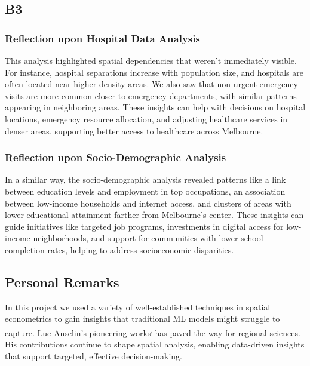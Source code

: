 \documentclass[
	a4paper, %
	10pt, %
	unnumberedsections, %
	twoside, %
]{LTJournalArticle}
\begin{document}
\subsection{B3}

\subsubsection{Reflection upon Hospital Data Analysis} \leavevmode
 
This analysis highlighted spatial dependencies that weren’t immediately visible. For instance, hospital separations increase with population size, and hospitals are often located near higher-density areas. We also saw that non-urgent emergency visits are more common closer to emergency departments, with similar patterns appearing in neighboring areas. These insights can help with decisions on hospital locations, emergency resource allocation, and adjusting healthcare services in denser areas, supporting better access to healthcare across Melbourne.

\subsubsection{Reflection upon Socio-Demographic Analysis}\leavevmode

In a similar way, the socio-demographic analysis revealed patterns like a link between education levels and employment in top occupations, an association between low-income households and internet access, and clusters of areas with lower educational attainment farther from Melbourne's center. These insights can guide initiatives like targeted job programs, investments in digital access for low-income neighborhoods, and support for communities with lower school completion rates, helping to address socioeconomic disparities.

\subsection{Personal Remarks}

In this project we used a variety of well-established techniques in spatial econometrics to gain insights that traditional ML models might struggle to capture. \href{https://en.wikipedia.org/wiki/Luc_Anselin}{Luc Anselin's} pioneering works\textsuperscript{\cite{Anselin1988}, \cite{Anselin1995}} has paved the way for regional sciences. His contributions continue to shape spatial analysis, enabling data-driven insights that support targeted, effective decision-making.
\end{document}
